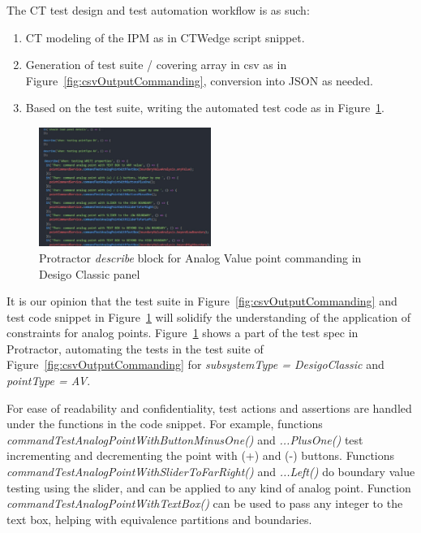 \documentclass[conference]{IEEEtran}
\begin{document}
	The CT test design and test automation workflow is as such:
	\begin{enumerate}
		\item CT modeling of the IPM as in CTWedge script snippet.
		\item Generation of test suite / covering array in csv as in Figure~\ref{fig:csvOutputCommanding}, conversion into JSON as needed.
		\item Based on the test suite, writing the automated test code as in Figure~\ref{fig:pointCommandingTestCode}.
	\end{enumerate}

	\begin{figure}[!b]
		\includegraphics[width=0.50\textwidth,]{pointCommandingTestCode.pdf}
		\caption{Protractor \textit{describe} block for Analog Value point commanding in Desigo Classic panel}
		\label{fig:pointCommandingTestCode}
	\end{figure}

	It is our opinion that the test suite in Figure~\ref{fig:csvOutputCommanding} and test code snippet in Figure~\ref{fig:pointCommandingTestCode} will solidify the understanding of the application of constraints for analog points.
	Figure~\ref{fig:pointCommandingTestCode} shows a part of the test spec in Protractor, automating the tests in the test suite of Figure~\ref{fig:csvOutputCommanding} for \textit{subsystemType = DesigoClassic} and \textit{pointType = AV}.
	
	For ease of readability and confidentiality, test actions and assertions are handled under the functions in the code snippet. 
	For example, functions \textit{commandTestAnalogPointWithButtonMinusOne()} and \textit{...PlusOne()} test incrementing and decrementing the point with (+) and (-) buttons.
	Functions \textit{commandTestAnalogPointWithSliderToFarRight()} and \textit{...Left()} do boundary value testing using the slider, and can be applied to any kind of analog point.
	Function \textit{commandTestAnalogPointWithTextBox()} can be used to pass any integer to the text box, helping with equivalence partitions and boundaries.
\end{document}
